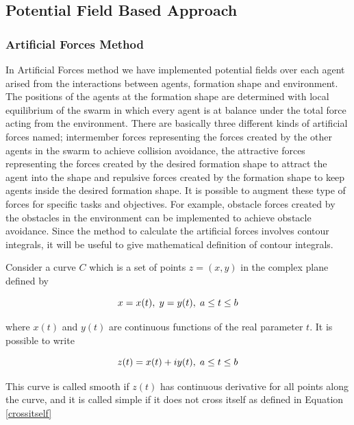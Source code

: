 \subsection{Potential Field Based Approach}

\subsubsection{Artificial Forces Method} \label{Artificial Forces Ref} \label{Artificial_forces_ref}
In Artificial Forces method we have implemented potential fields over each agent arised from the interactions between agents, formation shape and environment. The positions of the agents at the formation shape  are determined with local equilibrium of the swarm in which every agent is at balance under the total force acting from the environment. There are basically three different kinds of artificial forces named; intermember forces representing the forces created by the other agents in the swarm to achieve collision avoidance, the attractive forces representing the forces created by the desired formation shape to attract the agent into the shape and repulsive forces created by the formation shape to keep agents inside the desired formation shape. It is possible to augment these type of forces for specific tasks and objectives. For example, obstacle forces created by the obstacles in the environment can be implemented to achieve obstacle avoidance. Since the method to calculate the artificial forces involves contour integrals, it will be useful to give mathematical definition of contour integrals.
		
Consider a curve $C$ which is a set of points $z = (x,y)$ in the complex plane defined by \cite{wiki_contour}

\begin{equation}
x = x(t),   \hspace{0.1cm} y = y(t),  \hspace{0.1cm} a\leq t \leq b
\end{equation}

where $x(t)$ and $y(t)$ are continuous functions of the real parameter $t$.  It is possible to write
		
\begin{equation}
z(t) = x(t)+iy(t),   \hspace{0.1cm} a\leq t \leq b
\end{equation}
		
This curve is called smooth if $z(t)$ has continuous derivative for all points along the curve, and it is called simple if it does not cross itself as defined in Equation \ref{crossitself}

